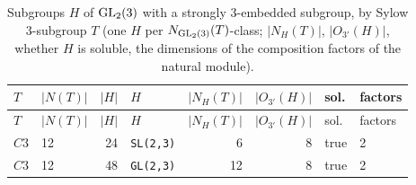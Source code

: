 \begin{longtable}{llrlrrll}
\caption{Subgroups $H$ of $\mathrm{GL}_2(3)$ with a strongly $3$-embedded subgroup, by Sylow $3$-subgroup $T$ (one $H$ per $N_{\mathrm{GL}_2(3)}(T)$-class; $|N_H(T)|$, $|O_{3'}(H)|$, whether $H$ is soluble, the dimensions of the composition factors of the natural module).}\label{tab:gl2}\\
\toprule
$T$ & $|N(T)|$ & $|H|$ & $H$ & $|N_H(T)|$ & $|O_{3'}(H)|$ & sol. & factors\\
\midrule
\endfirsthead
\toprule
$T$ & $|N(T)|$ & $|H|$ & $H$ & $|N_H(T)|$ & $|O_{3'}(H)|$ & sol. & factors\\
\midrule
\endhead
\bottomrule
\endfoot
$C3$ & 12 & 24 & \texttt{SL(2,3)} & 6 & 8 & true & 2\\
$C3$ & 12 & 48 & \texttt{GL(2,3)} & 12 & 8 & true & 2\\
\end{longtable}
